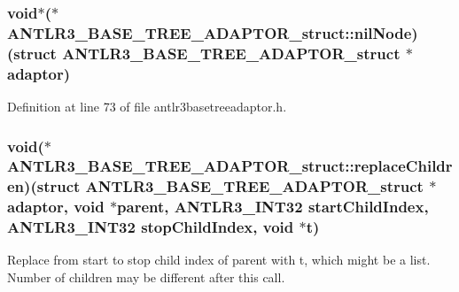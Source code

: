 \hypertarget{struct_a_n_t_l_r3___b_a_s_e___t_r_e_e___a_d_a_p_t_o_r__struct_ad83ac19a889169a7b3a63a3cca09ed05}{
\subsubsection[{nil\-Node}]{\setlength{\rightskip}{0pt plus 5cm}void$\ast$($\ast$ A\-N\-T\-L\-R3\-\_\-\-B\-A\-S\-E\-\_\-\-T\-R\-E\-E\-\_\-\-A\-D\-A\-P\-T\-O\-R\-\_\-struct\-::nil\-Node)(struct {\bf A\-N\-T\-L\-R3\-\_\-\-B\-A\-S\-E\-\_\-\-T\-R\-E\-E\-\_\-\-A\-D\-A\-P\-T\-O\-R\-\_\-struct} $\ast$adaptor)}}\label{struct_a_n_t_l_r3___b_a_s_e___t_r_e_e___a_d_a_p_t_o_r__struct_ad83ac19a889169a7b3a63a3cca09ed05}


Definition at line 73 of file antlr3basetreeadaptor.\-h.

\hypertarget{struct_a_n_t_l_r3___b_a_s_e___t_r_e_e___a_d_a_p_t_o_r__struct_a8dd0de04b25ba14306f168394332d10f}{
\subsubsection[{replace\-Children}]{\setlength{\rightskip}{0pt plus 5cm}void($\ast$ A\-N\-T\-L\-R3\-\_\-\-B\-A\-S\-E\-\_\-\-T\-R\-E\-E\-\_\-\-A\-D\-A\-P\-T\-O\-R\-\_\-struct\-::replace\-Children)(struct {\bf A\-N\-T\-L\-R3\-\_\-\-B\-A\-S\-E\-\_\-\-T\-R\-E\-E\-\_\-\-A\-D\-A\-P\-T\-O\-R\-\_\-struct} $\ast$adaptor, void $\ast$parent, {\bf A\-N\-T\-L\-R3\-\_\-\-I\-N\-T32} start\-Child\-Index, {\bf A\-N\-T\-L\-R3\-\_\-\-I\-N\-T32} stop\-Child\-Index, void $\ast${\bf t})}}\label{struct_a_n_t_l_r3___b_a_s_e___t_r_e_e___a_d_a_p_t_o_r__struct_a8dd0de04b25ba14306f168394332d10f}
Replace from start to stop child index of parent with t, which might be a list. Number of children may be different after this call.

